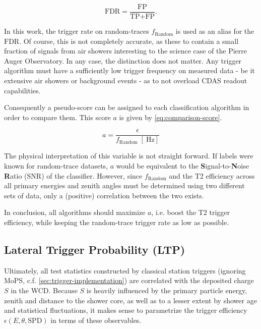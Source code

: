 \begin{equation}
	\label{eq:statistics-efficiency}
	\text{FDR} = \frac{\text{FP}}{\text{TP} + \text{FP}}.
\end{equation}

In this work, the trigger rate on random-traces $f_\text{Random}$ is used as an alias for the $\text{FDR}$. Of course, this is not completely accurate, as these 
to contain a small fraction of signals from air showers interesting to the science case of the Pierre Auger Observatory. In any case, the distinction does not 
matter. Any trigger algorithm must have a sufficiently low trigger frequency on measured data - be it extensive air showers or background events - as to not 
overload CDAS readout capabilities.

Consequently a pseudo-score can be assigned to each classification algorithm in order to compare them. This score $a$ is given by \autoref{eq:comparison-score}.

\begin{equation}
	\label{eq:comparison-score}
	a = \frac{\epsilon}{f_\text{Random}\;[\SI{}{\hertz}]}
\end{equation}

The physical interpretation of this variable is not straight forward. If labels were known for random-trace datasets, $a$ would be equivalent to the 
\textbf{S}ignal-to-\textbf{N}oise \textbf{R}atio (SNR) of the classifier. However, since $f_\text{Random}$ and the T2 efficiency across all primary energies and 
zenith angles must be determined using two different sets of data, only a (positive) correlation between the two exists.

In conclusion, all algorithms should maximize $a$, i.e. boost the T2 trigger efficiency, while keeping the random-trace trigger rate as low as possible.

\subsection{Lateral Trigger Probability (LTP)}
\label{ssec:lateral-trigger-probability}

Ultimately, all test statistics constructed by classical station triggers (ignoring MoPS, c.f. \autoref{sec:trigger-implementation}) are correlated with the 
deposited charge $S$ in the WCD. Because $S$ is heavily influenced by the primary particle energy, zenith and distance to the shower core, as well as to a lesser
extent by shower age and statistical fluctuations, it makes sense to parametrize the trigger efficiency $\epsilon(E, \theta, \text{SPD})$ in terms of these 
observables. 

